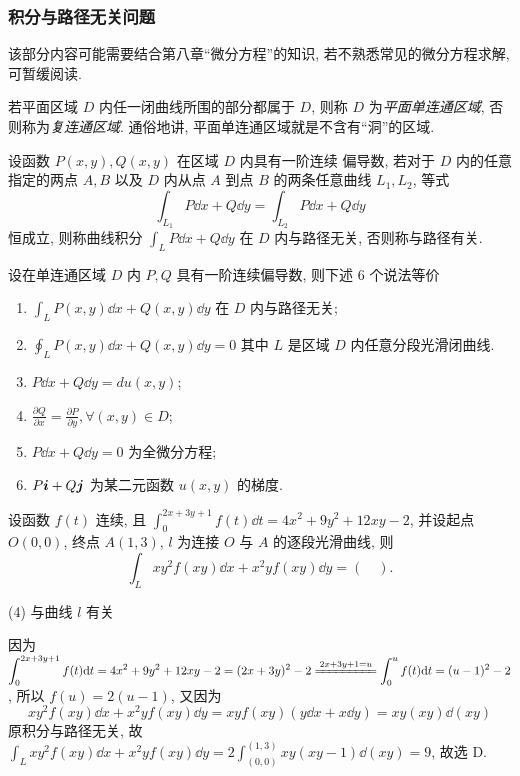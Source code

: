 \subsubsection{积分与路径无关问题}

该部分内容可能需要结合第八章“微分方程”的知识, 若不熟悉常见的微分方程求解, 可暂缓阅读.

\begin{definition}[单连通与复连通区域]
    若平面区域 $ D $ 内任一闭曲线所围的部分都属于 $D$, 则称 $ D $ 为\textit{平面单连通区域}, 否则称为\textit{复连通区域}. 通俗地讲, 平面单连通区域就是不含有“洞”的区域.
\end{definition}

\begin{theorem}[路径无关]
    设函数 $ P(x, y), Q(x, y) $ 在区域 $ D $ 内具有一阶连续 偏导数, 若对于 $ D $ 内的任意指定的两点  $A, B$  以及 $ D $ 内从点  $A$  到点 $ B$  的两条任意曲线 $ L_{1}, L_{2}$, 等式
    $$\int_{L_{1}} P \dd  x+Q \dd  y=\int_{L_{2}} P \dd  x+Q \dd  y$$
    恒成立, 则称曲线积分 $ \displaystyle\int_{L} P \dd  x+Q \dd  y $ 在 $ D $ 内与路径无关, 否则称与路径有关.
\end{theorem}

设在单连通区域 $ D $ 内 $ P, Q $ 具有一阶连续偏导数, 则下述 6 个说法等价
\begin{enumerate}[label=(\arabic{*})]
    \item $\displaystyle\int_{L} P(x, y) \dd  x+Q(x, y) \dd  y $ 在 $ D $ 内与路径无关;
    \item $\displaystyle \oint_{L} P(x, y) \dd  x+Q(x, y) \dd  y=0 $
          其中 $ L $ 是区域 $ D $ 内任意分段光滑闭曲线.
    \item $P \dd  x+Q \dd  y=d u(x, y)$;
    \item $\displaystyle\frac{\partial Q}{\partial x}=\frac{\partial P}{\partial y}, \forall(x, y) \in D $;
    \item $P \dd  x+Q \dd  y=0 $ 为全微分方程;
    \item $P \vb*{i}+Q \vb*{j}$ 为某二元函数 $ u(x, y) $ 的梯度.
\end{enumerate}

\begin{example}
    设函数 $f(t)$ 连续, 且 $ \displaystyle \int_{0}^{2x+3y+1} f(t) \dd t =4x^2+9y^2+12xy-2$, 并设起点 $O(0,0)$, 终点 $A(1,3)$, $l$ 为连接 $O$ 与 $A$ 的逐段光滑曲线, 则
    $$
    \int_L xy^2f(xy)\dd x+x^2y f(xy)\dd y=(\quad).
    $$
    \begin{tasks}(4)
        \task 与曲线 $l$ 有关
    \end{tasks}
\end{example}
\begin{solution}
    因为 $ \displaystyle \int_{0}^{2x+3y+1} f(t) \dd t =4x^2+9y^2+12xy-2=(2x+3y)^2-2\xlongequal{2x+3y+1=u}\int_{0}^{u} f(t) \dd t=(u-1)^2-2$, 所以 $f(u)=2(u-1)$, 又因为 
    $$
    xy^2f(xy)\dd x+x^2y f(xy)\dd y=xyf(xy)(y \dd x + x \dd y)=xy(xy)\dd (xy)
    $$
    原积分与路径无关, 故 $\displaystyle \int_L xy^2f(xy)\dd x+x^2y f(xy)\dd y=2\int_{(0,0)}^{(1,3)} xy(xy-1) \dd (xy)=9$, 故选 D.
\end{solution}

